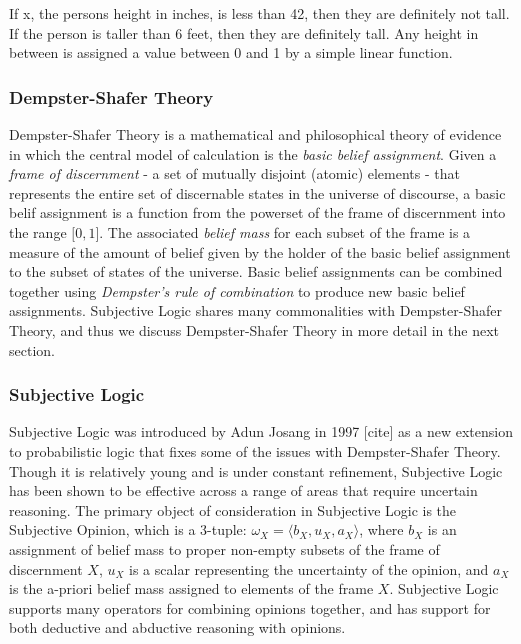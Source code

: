 \documentclass[thesis.tex]{subfiles}
\begin{document}
If x, the persons height in inches, is less than 42, then they are definitely
not tall. If the person is taller than 6 feet, then they are definitely tall.
Any height in between is assigned a value between 0 and 1 by a simple linear
function.





\subsubsection{Dempster-Shafer Theory}

Dempster-Shafer Theory is a mathematical and philosophical theory of evidence in
which the central model of calculation is the \emph{basic belief assignment}. Given
a \emph{frame of discernment} - a set of mutually disjoint (atomic) elements - that
represents the entire set of discernable states in the universe of discourse, a
basic belif assignment is a function from the powerset of the frame of discernment
into the range $\lbrack 0, 1\rbrack$. The associated \emph{belief mass} for each
subset of the frame is a measure of the amount of belief given by the holder of
the basic belief assignment to the subset of states of the universe. Basic belief
assignments can be combined together using \emph{Dempster's rule of combination}
to produce new basic belief assignments. Subjective Logic shares many commonalities
with Dempster-Shafer Theory, and thus we discuss Dempster-Shafer Theory in more detail
in the next section.



\subsubsection{Subjective Logic}

Subjective Logic was introduced by Adun Josang in 1997 [cite] as a new
extension to probabilistic logic that fixes some of the issues with
Dempster-Shafer Theory. Though it is relatively young and is under
constant refinement, Subjective Logic has been shown to be effective
across a range of areas that require uncertain reasoning.  The primary
object of consideration in Subjective Logic is the Subjective Opinion,
which is a 3-tuple: $\omega_X = \langle b_X, u_X, a_X \rangle$, where
$b_X$ is an assignment of belief mass to proper non-empty subsets of
the frame of discernment $X$, $u_X$ is a scalar representing the
uncertainty of the opinion, and $a_X$ is the a-priori belief mass
assigned to elements of the frame $X$. Subjective Logic supports many
operators for combining opinions together, and has support for both
deductive and abductive reasoning with opinions.
\end{document}

